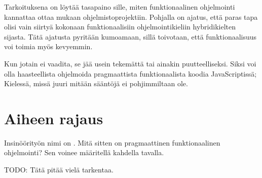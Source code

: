 Tarkoituksena on löytää tasapaino sille, miten funktionaalinen ohjelmointi kannattaa ottaa mukaan ohjelmistoprojektiin. Pohjalla on ajatus, että paras tapa olisi vain siirtyä kokonaan funktionaalisiin ohjelmointikieliin hybridikielten sijasta. Tätä ajatusta pyritään kumoamaan, sillä toivotaan, että funktionaalisuus voi toimia myös kevyemmin.

Kun jotain ei vaadita, se jää usein tekemättä tai ainakin puutteelliseksi. Siksi voi olla haasteellista ohjelmoida pragmaattista funktionaalista koodia JavaScriptissä; Kielessä, missä juuri mitään sääntöjä ei pohjimmiltaan ole.

\section{Aiheen rajaus}

Insinöörityön nimi on \textquote{\otsikko}. Mitä sitten on pragmaattinen funktionaalinen ohjelmointi? Sen voinee määritellä kahdella tavalla.

TODO: Tätä pitää vielä tarkentaa.